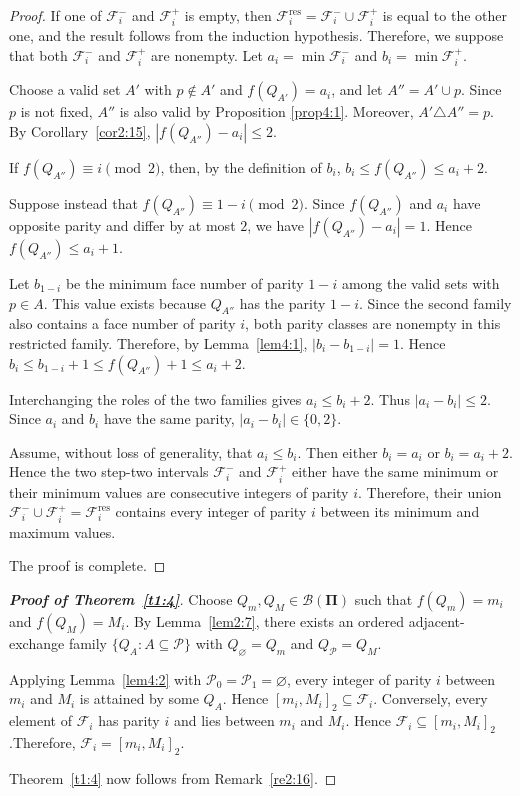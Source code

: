 \documentclass[10pt,a4paper]{amsart}
\newcommand{\intervaltwo}[2]{[#1,#2]_2}
\begin{document}
\begin{proof}
If one of $\mathcal F_i^-$ and $\mathcal F_i^+$ is empty, then $\mathcal F_i^{\mathrm{res}}=\mathcal F_i^-\cup\mathcal F_i^+$ is equal to the other one, and the result follows from the induction hypothesis. Therefore, we suppose that both $\mathcal F_i^-$ and $\mathcal F_i^+$ are nonempty. Let $a_i=\min\mathcal F_i^-$ and $b_i=\min\mathcal F_i^+$.

Choose a valid set $A'$ with $p\notin A'$ and
$f(Q_{A'})=a_i$, and let $A''=A'\cup{p}$. Since $p$ is not
fixed, $A''$ is also valid by Proposition \ref{prop4:1}. Moreover,
$A'\triangle A''={p}$. By
Corollary~\ref{cor2:15},
$|f(Q_{A''})-a_i|\leq2$.

If $f(Q_{A''})\equiv i\pmod{2}$, then, by the definition of $b_i$,
$b_i\leq f(Q_{A''})\leq a_i+2$.

Suppose instead that
$f(Q_{A''})\equiv1-i\pmod{2}$. Since $f(Q_{A''})$ and $a_i$ have
opposite parity and differ by at most $2$, we have
$|f(Q_{A''})-a_i|=1$. Hence
$f(Q_{A''})\leq a_i+1$.

Let $b_{1-i}$ be the minimum face number of parity $1-i$ among the
valid sets with $p\in A$. This value exists because $Q_{A''}$ has
the parity $1-i$. Since the second family also contains a face number of
parity $i$, both parity classes are nonempty in this restricted
family. Therefore, by Lemma~\ref{lem4:1},
$|b_i-b_{1-i}|=1$. Hence
$b_i\leq b_{1-i}+1\leq f(Q_{A''})+1\leq a_i+2$.

Interchanging the roles of the two families gives
$a_i\leq b_i+2$. Thus
$|a_i-b_i|\leq2$. Since $a_i$ and $b_i$ have the same parity,
$|a_i-b_i|\in\{0,2\}$.

 Assume, without loss of generality, that $a_i\leq b_i$. Then either
$b_i=a_i$ or $b_i=a_i+2$. Hence the two step-two intervals
$\mathcal F_i^-$ and $\mathcal F_i^+$ either have the same minimum or
their minimum values are consecutive integers of parity $i$. Therefore,
their union
$\mathcal F_i^-\cup\mathcal F_i^+=\mathcal F_i^{\mathrm{res}}$
contains every integer of parity $i$ between its minimum and maximum
values.

The proof is complete.
\end{proof}



\begin{proof}[\bf{Proof of Theorem~\ref{t1:4}}]
Choose $Q_m,Q_M\in\mathcal B(\mathbf{\Pi})$ such that
$f(Q_m)=m_i$ and $f(Q_M)=M_i$. By Lemma~\ref{lem2:7}, there exists
an ordered adjacent-exchange family
$\{Q_A:A\subseteq\mathcal P\}$ with
$Q_\varnothing=Q_m$ and $Q_{\mathcal P}=Q_M$.

Applying Lemma~\ref{lem4:2} with
$\mathcal P_0=\mathcal P_1=\varnothing$, every integer of parity $i$
between $m_i$ and $M_i$ is attained by some $Q_A$. Hence
$\intervaltwo{m_i}{M_i}\subseteq\mathcal F_i$.  Conversely, every element of \(\mathcal F_i\) has parity \(i\) and lies between \(m_i\) and \(M_i\). Hence \(\mathcal F_i\subseteq\intervaltwo{m_i}{M_i}\).Therefore,
$\mathcal F_i=\intervaltwo{m_i}{M_i}$.

Theorem~\ref{t1:4} now follows from Remark~\ref{re2:16}.
\end{proof}
\end{document}
